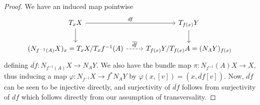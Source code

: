 \documentclass[reqno]{amsart}
\theoremstyle{definition}
\theoremstyle{remark}
\begin{document}
\begin{proof}
    We have an induced map pointwise
    \begin{equation*}
    \begin{tikzcd}
        T_x X \ar[r, "df"] \ar[d] & T_{f(x)}Y \ar[d] \\
        (N_{f^{-1}(A)}X)_x = 
        T_{x}X / T_{x}f^{-1}(A) \ar[r, "\overline{df}", dashed] &
        T_{f(x)}Y / T_{f(x)}A = (N_A Y)_{f(x)}
    \end{tikzcd}
    \end{equation*}
    defining
    $\overline{df} \colon N_{f^{-1}(A)}X \to 
    N_A Y$.
    We also have the bundle map
    $\pi \colon N_{f^{-1}}(A) X \to X$, thus inducing a map
    $\varphi \colon N_{f^{-1}}X \to 
    f^{*}N_A Y$ by $\varphi \left( x, \left[ v \right]  \right) 
    = \left( x , \overline{df}\left[ v \right]  \right) $.
    Now, $\overline{df}$ can be seen to be injective directly,
    and surjectivity of $\overline{df}$ follows
    from surjectivity of $df$ which follows
    directly from our assumption of transversality.
\end{proof}







\newpage
\printbibliography
\end{document}
